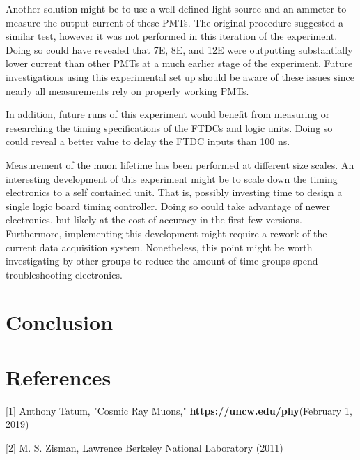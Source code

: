 \documentclass{article}
\begin{document}
Another solution might be to use a well defined light source and an ammeter to measure the output current of these PMTs. The original procedure suggested a similar test, however it was not performed in this iteration of the experiment. Doing so could have revealed that 7E, 8E, and 12E were outputting substantially lower current than other PMTs at a much earlier stage of the experiment. Future investigations using this experimental set up should be aware of these issues since nearly all measurements rely on properly working PMTs.

 In addition, future runs of this experiment would benefit from measuring or researching the timing specifications of the FTDCs and logic units. Doing so could reveal a better value to delay the FTDC inputs than 100 ns.

Measurement of the muon lifetime has been performed at different size scales. An interesting development of this experiment might be to scale down the timing electronics to a self contained unit. That is, possibly investing time to design a single logic board timing controller. Doing so could take advantage of newer electronics, but likely at the cost of accuracy in the first few versions. Furthermore, implementing this development might require a rework of the current data acquisition system. Nonetheless, this point might be worth investigating by other groups to reduce the amount of time groups spend troubleshooting electronics.

\section*{Conclusion}

\section*{References}

\hspace{4mm} [1] \hspace{1mm}  Anthony Tatum, "Cosmic Ray Muons," \textbf{https://uncw.edu/phy}\newline (February 1, 2019)

\vspace{3mm}

[2] \hspace{1mm} M. S. Zisman, Lawrence Berkeley National Laboratory (2011)

\vspace{3 mm}
\end{document}
